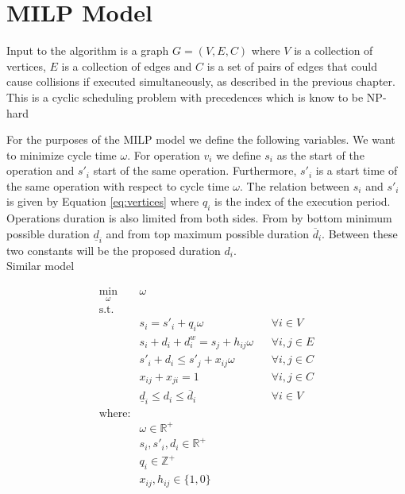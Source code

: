 \chapter{MILP Model}
\label{ch:milp_model}
\graphicspath{{chapters/MILP_Model/}}

Input to the algorithm is a graph \(G=(V, E, C)\) where \(V\) is a collection of vertices, $E$ is a collection of edges and $C$ is a set of pairs of edges that could cause collisions if executed simultaneously, as described in the previous chapter. \\

This is a cyclic scheduling problem with precedences which is know to be NP-hard \cite{SuchaCyclicSchedulingFPGA}

For the purposes of the MILP model we define the following variables. We want to minimize cycle time $\omega$. For operation $v_i$ we define $s_i$ as the start of the operation and $s'_i$ start of the same operation.
Furthermore, $s'_i$ is a start time of the same operation with respect to cycle time $\omega$. The relation between $s_i$ and $s'_i$ is given by Equation \ref{eq:vertices} where $q_i$ is the index of the execution period.
Operations duration is also limited from both sides. From by bottom minimum possible duration $\underline{d}_i$ and from top maximum possible duration $\overline{d}_i$. Between these two constants will be the proposed duration $d_i$. \\



Similar model 

\begin{align}
    \min_\omega\text{ } & \omega  \\
    \text{s.t. } \\
        & s_i  =  s'_i + q_i \omega & & \forall i \in V     \label{eq:vertices}\\
        & s_i + d_i + d^w_i =  s_j + h_{ij} \omega & & \forall i, j \in E \\
        & s'_i + d_i  \leq  s'_j + x_{ij} \omega & & \forall i, j \in C \\
        & x_{ij} + x_{ji}  =  1 & & \forall i, j \in C \\
        & \underline{d}_i \leq  d_i \leq \overline{d}_i & & \forall i \in V \\
    \text{where:} \\
        & \omega \in \mathbb{R}^+\\
        & s_i, s'_i, d_i \in \mathbb{R}^+\\
        & q_i \in \mathbb{Z}^+\\
        & x_{ij}, h_{ij} \in \{1, 0\} 
\end{align}




